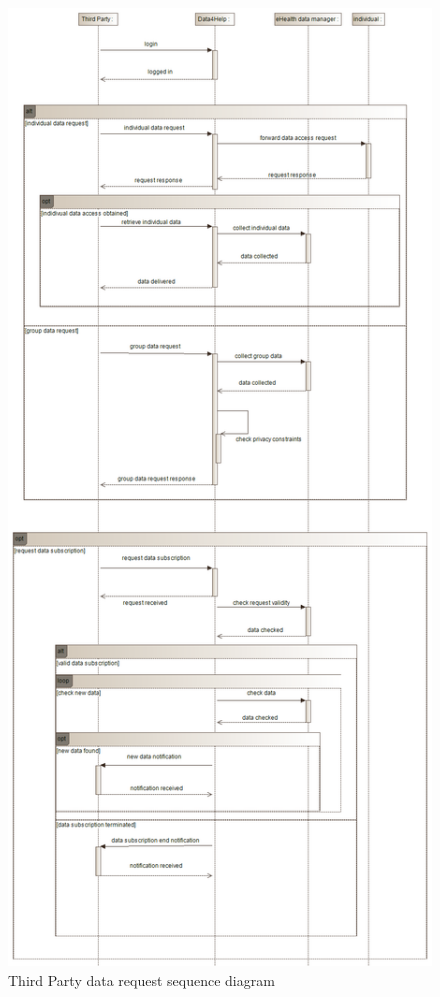 \begin{figure}[p]
	\centering
  \includegraphics[width=0.67\linewidth]{resources/UML/ThirdPartyDataRequest.png}
  \caption{Third Party data request sequence diagram}
  \label{fig: ThirdParty sequence diagram}
\end{figure}

